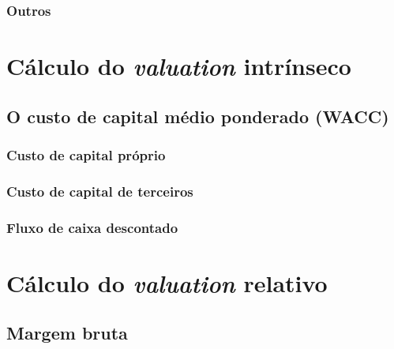 \documentclass[grad,numbers]{coppe}
\begin{document}
  \hypertarget{outros}{%
  \subsubsection{Outros}\label{outros}}
  
  \hypertarget{cuxe1lculo-do-valuation-intruxednseco}{%
  \section{\texorpdfstring{Cálculo do \emph{valuation} intrínseco}{Cálculo do valuation intrínseco}}\label{cuxe1lculo-do-valuation-intruxednseco}}
  
  \hypertarget{o-custo-de-capital-muxe9dio-ponderado-wacc}{%
  \subsection{O custo de capital médio ponderado (WACC)}\label{o-custo-de-capital-muxe9dio-ponderado-wacc}}
  
  \hypertarget{custo-de-capital-pruxf3prio}{%
  \subsubsection{Custo de capital próprio}\label{custo-de-capital-pruxf3prio}}
  
  \hypertarget{custo-de-capital-de-terceiros}{%
  \subsubsection{Custo de capital de terceiros}\label{custo-de-capital-de-terceiros}}
  
  \hypertarget{fluxo-de-caixa-descontado}{%
  \subsubsection{Fluxo de caixa descontado}\label{fluxo-de-caixa-descontado}}
  
  \hypertarget{cuxe1lculo-do-valuation-relativo}{%
  \section{\texorpdfstring{Cálculo do \emph{valuation} relativo}{Cálculo do valuation relativo}}\label{cuxe1lculo-do-valuation-relativo}}
  
  \hypertarget{margem-bruta}{%
  \subsection{Margem bruta}\label{margem-bruta}}
  
\end{document}
